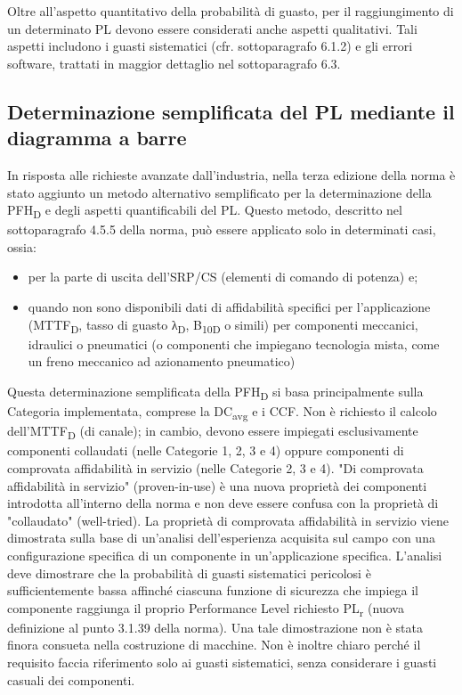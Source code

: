 Oltre all'aspetto quantitativo della probabilità di guasto, per il raggiungimento di un determinato PL devono essere considerati anche aspetti qualitativi. Tali aspetti includono i guasti sistematici (cfr. sottoparagrafo 6.1.2) e gli errori software, trattati in maggior dettaglio nel sottoparagrafo 6.3.

\subsection{Determinazione semplificata del PL mediante il diagramma a barre}
\label{subsec:06-2-17}
In risposta alle richieste avanzate dall'industria, nella terza edizione della norma è stato aggiunto un metodo alternativo semplificato per la determinazione della PFH\textsubscript{D} e degli aspetti quantificabili del PL. Questo metodo, descritto nel sottoparagrafo 4.5.5 della norma, può essere applicato solo in determinati casi, ossia:
\begin{itemize}
    \item per la parte di uscita dell'SRP/CS (elementi di comando di potenza) e;
    \item quando non sono disponibili dati di affidabilità specifici per l'applicazione (MTTF\textsubscript{D}, tasso di guasto λ\textsubscript{D}, B\textsubscript{10D} o simili) per componenti meccanici, idraulici o pneumatici (o componenti che impiegano tecnologia mista, come un freno meccanico ad azionamento pneumatico)
\end{itemize}

Questa determinazione semplificata della PFH\textsubscript{D} si basa principalmente sulla Categoria implementata, comprese la DC\textsubscript{avg} e i CCF. Non è richiesto il calcolo dell'MTTF\textsubscript{D} (di canale); in cambio, devono essere impiegati esclusivamente componenti collaudati (nelle Categorie 1, 2, 3 e 4) oppure componenti di comprovata affidabilità in servizio (nelle Categorie 2, 3 e 4). "Di comprovata affidabilità in servizio" (proven-in-use) è una nuova proprietà dei componenti introdotta all'interno della norma e non deve essere confusa con la proprietà di "collaudato" (well-tried). La proprietà di comprovata affidabilità in servizio viene dimostrata sulla base di un'analisi dell'esperienza acquisita sul campo con una configurazione specifica di un componente in un'applicazione specifica. L'analisi deve dimostrare che la probabilità di guasti sistematici pericolosi è sufficientemente bassa affinché ciascuna funzione di sicurezza che impiega il componente raggiunga il proprio Performance Level richiesto PL\textsubscript{r} (nuova definizione al punto 3.1.39 della norma). Una tale dimostrazione non è stata finora consueta nella costruzione di macchine. Non è inoltre chiaro perché il requisito faccia riferimento solo ai guasti sistematici, senza considerare i guasti casuali dei componenti.

